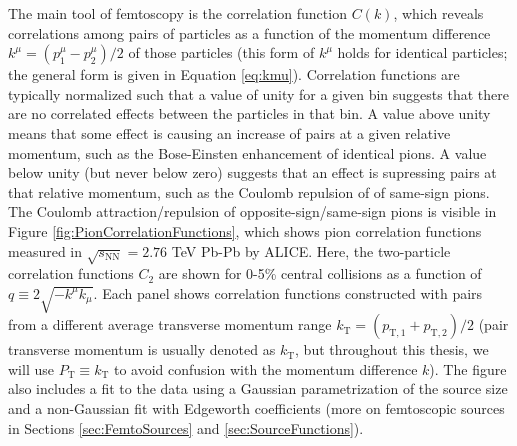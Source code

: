 The main tool of femtoscopy is the correlation function $C(k)$, which reveals correlations among pairs of particles as a function of the momentum difference $k^\mu = (p_1^\mu - p_2^\mu)/2$ of those particles (this form of $k^\mu$ holds for identical particles; the general form is given in Equation \ref{eq:kmu}).
Correlation functions are typically normalized such that a value of unity for a given bin suggests that there are no correlated effects between the particles in that bin.
A value above unity means that some effect is causing an increase of pairs at a given relative momentum, such as the Bose-Einsten enhancement of identical pions. 
A value below unity (but never below zero) suggests that an effect is supressing pairs at that relative momentum, such as the Coulomb repulsion of of same-sign pions.
The Coulomb attraction/repulsion of opposite-sign/same-sign pions is visible in Figure \ref{fig:PionCorrelationFunctions}, which shows pion correlation functions measured in $\sqrt{s_\mathrm{NN}} = 2.76$ TeV Pb-Pb by ALICE.
Here, the two-particle correlation functions $C_2$ are shown for 0-5\% central collisions as a function of $q \equiv 2 \sqrt{-k^\mu k_\mu}$.
Each panel shows correlation functions constructed with pairs from a different average transverse momentum range $k_\mathrm{T} = (p_\mathrm{T,1} + p_\mathrm{T,2})/2$ (pair transverse momentum is usually denoted as $k_\mathrm{T}$, but throughout this thesis, we will use $P_\mathrm{T} \equiv k_\mathrm{T}$ to avoid confusion with the momentum difference $k$). 
The figure also includes a fit to the data using a Gaussian parametrization of the source size and a non-Gaussian fit with Edgeworth coefficients \cite{Blinnikov:1997jq} (more on femtoscopic sources in Sections \ref{sec:FemtoSources} and \ref{sec:SourceFunctions}).

